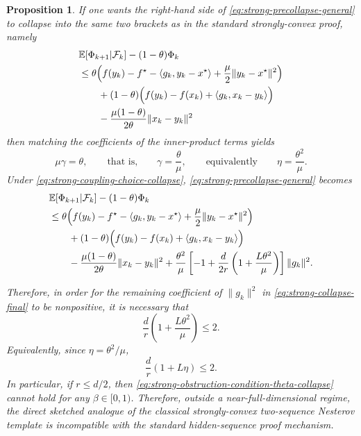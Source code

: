 \documentclass[10pt]{article}
\newtheorem{proposition}[proposition]{Proposition}
\begin{document}
\begin{proposition}
If one wants the right-hand side of \eqref{eq:strong-precollapse-general} to collapse into the same two brackets as in the standard strongly-convex proof, namely
\begin{align}
&\mathbb{E}\!\left[\Phi_{k+1}\middle|\mathcal F_k\right]-(1-\theta)\Phi_k
\notag\\
&\le
\theta\Bigl(
f(y_k)-f^\star-\langle g_k,y_k-x^\star\rangle+\frac{\mu}{2}\|y_k-x^\star\|^2
\Bigr)
\notag\\
&\qquad
+(1-\theta)\Bigl(
f(y_k)-f(x_k)+\langle g_k,x_k-y_k\rangle
\Bigr)
\notag\\
&\qquad
-\frac{\mu(1-\theta)}{2\theta}\|x_k-y_k\|^2
\label{eq:strong-desired-collapse}
\end{align}
then matching the coefficients of the inner-product terms yields
\begin{equation}
\mu\gamma=\theta,
\qquad\text{that is,}\qquad
\gamma=\frac{\theta}{\mu},
\qquad\text{equivalently}\qquad
\eta=\frac{\theta^2}{\mu}.
\label{eq:strong-coupling-choice-collapse}
\end{equation}
Under \eqref{eq:strong-coupling-choice-collapse}, \eqref{eq:strong-precollapse-general} becomes
\begin{align}
&\mathbb{E}\!\left[\Phi_{k+1}\middle|\mathcal F_k\right]-(1-\theta)\Phi_k
\notag\\
&\le
\theta\Bigl(
f(y_k)-f^\star-\langle g_k,y_k-x^\star\rangle+\frac{\mu}{2}\|y_k-x^\star\|^2
\Bigr)
\notag\\
&\qquad
+(1-\theta)\Bigl(
f(y_k)-f(x_k)+\langle g_k,x_k-y_k\rangle
\Bigr)
\notag\\
&\qquad
-\frac{\mu(1-\theta)}{2\theta}\|x_k-y_k\|^2
+\frac{\theta^2}{\mu}
\left[
-1+\frac{d}{2r}\left(1+\frac{L\theta^2}{\mu}\right)
\right]\|g_k\|^2.
\label{eq:strong-collapse-final}
\end{align}

Therefore, in order for the remaining coefficient of \(\|g_k\|^2\) in
\eqref{eq:strong-collapse-final} to be nonpositive, it is necessary that
\begin{equation}
\frac{d}{r}\left(1+\frac{L\theta^2}{\mu}\right)\le 2.
\label{eq:strong-obstruction-condition-theta-collapse}
\end{equation}
Equivalently, since \(\eta=\theta^2/\mu\),
\begin{equation}
\frac{d}{r}(1+L\eta)\le 2.
\label{eq:strong-obstruction-condition-eta-collapse}
\end{equation}
In particular, if \(r\le d/2\), then \eqref{eq:strong-obstruction-condition-theta-collapse}
cannot hold for any \(\beta\in[0,1)\).
Therefore, outside a near-full-dimensional regime, the direct sketched analogue of the
classical strongly-convex two-sequence Nesterov template is incompatible with the
standard hidden-sequence proof mechanism.
\end{proposition}
\end{document}
